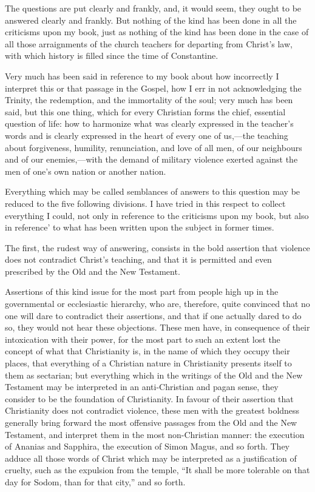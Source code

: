 \documentclass{book}
\begin{document}
The questions are put clearly and frankly, and, it would seem, they ought to be answered clearly and frankly. But nothing of the kind has been done in all the criticisms upon my book, just as nothing of the kind has been done in the case of all those arraignments of the church teachers for departing from Christ’s law, with which history is filled since the time of Constantine.

Very much has been said in reference to my book about how incorrectly I interpret this or that passage in the Gospel, how I err in not acknowledging the Trinity, the redemption, and the immortality of the soul; very much has been said, but this one thing, which for every Christian forms the chief, essential question of life: how to harmonize what was clearly expressed in the teacher’s words and is clearly expressed in the heart of every one of us,—the teaching about forgiveness, humility, renunciation, and love of all men, of our neighbours and of our enemies,—with the demand of military violence exerted against the men of one’s own nation or another nation.

Everything which may be called semblances of answers to this question may be reduced to the five following divisions. I have tried in this respect to collect everything I could, not only in reference to the criticisms upon my book, but also in reference’ to what has been written upon the subject in former times.

The first, the rudest way of answering, consists in the bold assertion that violence does not contradict Christ’s teaching, and that it is permitted and even prescribed by the Old and the New Testament.

Assertions of this kind issue for the most part from people high up in the governmental or ecclesiastic hierarchy, who are, therefore, quite convinced that no one will dare to contradict their assertions, and that if one actually dared to do so, they would not hear these objections. These men have, in consequence of their intoxication with their power, for the most part to such an extent lost the concept of what that Christianity is, in the name of which they occupy their places, that everything of a Christian nature in Christianity presents itself to them as sectarian; but everything which in the writings of the Old and the New Testament may be interpreted in an anti-Christian and pagan sense, they consider to be the foundation of Christianity. In favour of their assertion that Christianity does not contradict violence, these men with the greatest boldness generally bring forward the most offensive passages from the Old and the New Testament, and interpret them in the most non-Christian manner: the execution of Ananias and Sapphira, the execution of Simon Magus, and so forth. They adduce all those words of Christ which may be interpreted as a justification of cruelty, such as the expulsion from the temple, “It shall be more tolerable on that day for Sodom, than for that city,” and so forth.
\end{document}
